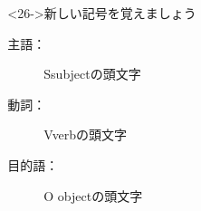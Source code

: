\documentclass[aspectratio=169,xcolor={dvipsnames,table}]{beamer}
\begin{document}
\begin{frame}[plain]
\begin{columns}[t]
\begin{column}{.55\textwidth}
\begin{exampleblock}
 \end{exampleblock}
\hfill{}%
\end{column} 
\begin{column}{.44\textwidth}
 \begin{block}<26->{新しい記号を覚えましょう}
       \begin{description}
	\item[主語：] S\hfill{subjectの頭文字} 
	\item[動詞：] V\hfill{verbの頭文字}
	\item[目的語：] O \hfill{objectの頭文字}
       \end{description}
      \end{block}
\end{column} 
\end{columns}

\end{frame}
\end{document}
